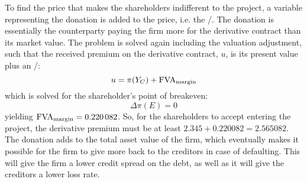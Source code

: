 \documentclass[../main.tex]{subfiles}
\begin{document}
        To find the price that makes the shareholders indifferent to the project,
        a variable representing the donation is added to the price, i.e. the \MVA/.
        The donation is essentially the counterparty paying the firm more for the derivative contract than its market value.
        The problem is solved again including the valuation adjustment,
        such that the received premium on the derivative contract, $u$, is its present value plus an \MVA/:
        \begin{equation}
            u = \pi(Y_C) + \MVA/
        \end{equation}
        which is solved for the shareholder's point of breakeven:
        \begin{equation}
            \Delta \pi(E) = 0
        \end{equation}
        yielding $\MVA/ = \num{0.220082}$. So, for the shareholders to accept entering the project, the derivative premium must be at least $\num{2.345} + \num{0.220082} = \num{2.565082}$.
        The donation adds to the total asset value of the firm,
        which eventually makes it possible for the firm to give more back to the creditors in case of defaulting.
        This will give the firm a lower credit spread on the debt, as well as it will give the creditors a lower loss rate.
\end{document}
